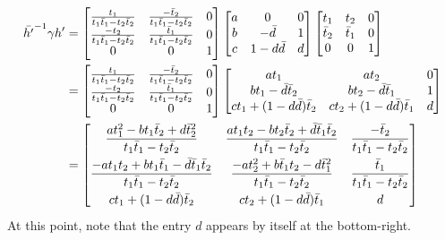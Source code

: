 \begin{align*}
  \bar{h'} ^{-1} \gamma h'
  &=
  \begin{bmatrix}
  \frac{t_1}{t_1 \bar t_1 - t_2 \bar t_2} & \frac{-\bar t_2}{t_1 \bar t_1 - t_2 \bar t_2} & 0 \\
  \frac{-t_2}{t_1 \bar t_1 - t_2 \bar t_2} & \frac{\bar t_1}{t_1 \bar t_1 - t_2 \bar t_2} & 0 \\
  0 & 0 & 1 \end{bmatrix}
  \begin{bmatrix}
    a & 0 & 0 \\
    b & - \bar d & 1 \\
    c & 1 - d \bar d & d
  \end{bmatrix}
  \begin{bmatrix}
  t_1 & t_2 & 0  \\
  \bar t_2 & \bar t_1 & 0 \\
  0 & 0 & 1
  \end{bmatrix} \\
  &=
  \begin{bmatrix}
  \frac{t_1}{t_1 \bar t_1 - t_2 \bar t_2} & \frac{-\bar t_2}{t_1 \bar t_1 - t_2 \bar t_2} & 0 \\
  \frac{-t_2}{t_1 \bar t_1 - t_2 \bar t_2} & \frac{\bar t_1}{t_1 \bar t_1 - t_2 \bar t_2} & 0 \\
  0 & 0 & 1 \end{bmatrix}
  \begin{bmatrix}
    at_1 & at_2 & 0 \\
    bt_1 - \bar d \bar t_2 & b t_2 - \bar d \bar t_1 & 1 \\
    ct_1 + (1-d\bar d)\bar t_2 & ct_2 + (1-d \bar d) \bar t_1 & d
  \end{bmatrix}
  \\
  &=
  \begin{bmatrix}
    \dfrac{at_1^2 - bt_1 \bar t_2 + d \bar t_2^2}{t_1 \bar t_1 - t_2 \bar t_2}
    & \dfrac{at_1t_2 - bt_2 \bar t_2 + \bar d \bar t_1 \bar t_2}{t_1 \bar t_1 - t_2 \bar t_2}
    & \dfrac{-\bar t_2}{t_1 \bar t_1 - t_2 \bar t_2} \\[2ex]
    \dfrac{-at_1t_2+bt_1\bar t_1-\bar d \bar t_1 \bar t_2}{t_1 \bar t_1 - t_2 \bar t_2}
    & \dfrac{-at_2^2+b\bar t_1 t_2-d\bar t_1^2}{t_1 \bar t_1 - t_2 \bar t_2}
    & \dfrac{\bar t_1}{t_1 \bar t_1 - t_2 \bar t_2} \\[2ex]
    ct_1 + (1-d\bar d)\bar t_2 & ct_2 + (1-d \bar d) \bar t_1 & d
  \end{bmatrix}
\end{align*}
At this point, note that the entry $d$ appears by itself at the bottom-right.

